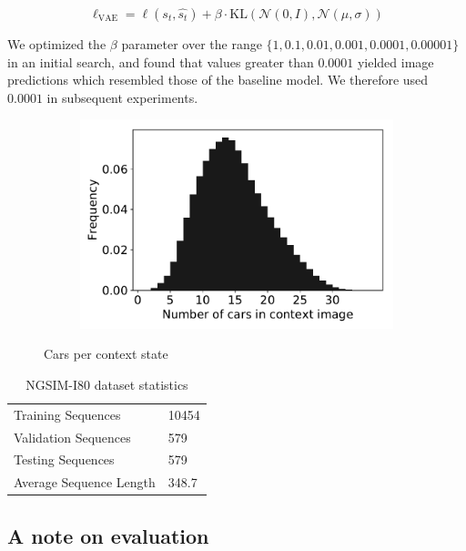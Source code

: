 \documentclass{article}
\begin{document}
\begin{appendices}
\begin{equation}
  \ell_{\text{VAE}} = \ell(s_t, \hat{s_t}) + \beta \cdot \mbox{KL}(\mathcal{N}(0, I), \mathcal{N}(\mu, \sigma))
\end{equation}

We optimized the $\beta$ parameter over the range $\{1, 0.1, 0.01, 0.001, 0.0001, 0.00001 \}$ in an initial search, and found that values greater than $0.0001$ yielded image predictions which resembled those of the baseline model.
We therefore used $0.0001$ in subsequent experiments.


\begin{figure}
  \centering
  \begin{subfigure}[b]{0.5\textwidth}
    \includegraphics[width=\textwidth]{images/car_statistics.pdf}
  \end{subfigure}
  \caption{Cars per context state}
  \label{car-statistics}
\end{figure}


\begin{table}
  \caption{NGSIM-I80 dataset statistics}
  \label{i80-stats}
  \centering
  \begin{tabular}{ll}
    \toprule
    Training Sequences     & 10454 \\
    Validation Sequences & 579 \\
    Testing Sequences & 579 \\
    Average Sequence Length & 348.7 \\
    \bottomrule
  \end{tabular}
\end{table}



\subsection{A note on evaluation} \label{proof}


\end{appendices}
\end{document}
